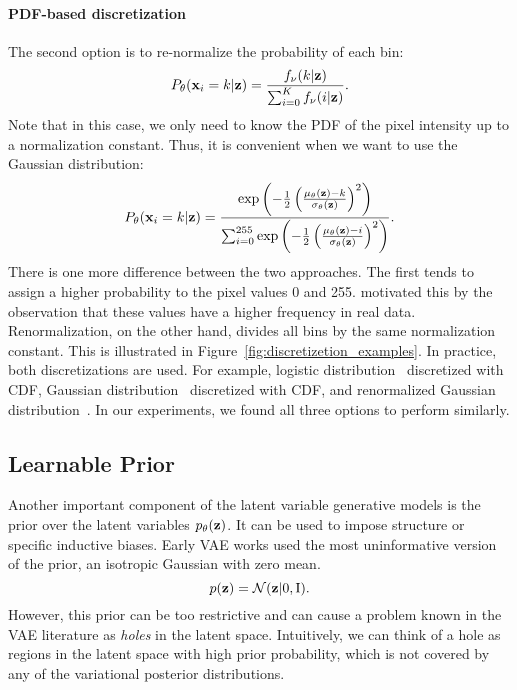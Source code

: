 \paragraph{PDF-based discretization}
The second option is to re-normalize the probability of each bin:
\begin{equation}\label{eq:intro_softmax_discr}
\begin{aligned}
    P_{\theta}(\rvx_i = k|\rvz) = \frac{f_{\nu}(k|\rvz)}{\sum_{i=0}^K f_{\nu}(i|\rvz)}.
\end{aligned}
\end{equation}
Note that in this case, we only need to know the PDF of the pixel intensity up to a normalization constant. 
Thus, it is convenient when we want to use the Gaussian distribution:
\begin{equation}
\begin{aligned}
    P_{\theta}({\mathbf{x}}_i = k|{\mathbf{z}}) = \frac{\exp\left(-\frac12 \left(\frac{\mu_{\theta}({\mathbf{z}}) - k}{\sigma_{\theta}({\mathbf{z}})}\right)^2\right)}{\sum_{i=0}^{255} \exp\left(-\frac12 \left(\frac{\mu_{\theta}({\mathbf{z}}) - i}{\sigma_{\theta}({\mathbf{z}})}\right)^2\right)}.
\end{aligned}
\end{equation}
There is one more difference between the two approaches. The first tends to assign a higher probability to the pixel values 0 and 255. \citet{salimans2016improved} motivated this by the observation that these values have a higher frequency in real data. Renormalization, on the other hand, divides all bins by the same normalization constant. This is illustrated in Figure~\ref{fig:discretizetion_examples}.
In practice, both discretizations are used. 
For example, logistic distribution~\citep{vahdat2020nvae, Child2020-ze} discretized with CDF, Gaussian distribution~\citep{ho2020denoising} discretized with CDF, and renormalized Gaussian distribution~\citep{kingma2021variational}. 
In our experiments, we found all three options to perform similarly. 

\subsection{Learnable Prior}
Another important component of the latent variable generative models is the prior over the latent variables $p_{\theta}({\mathbf{z}})$.
It can be used to impose structure or specific inductive biases. 
Early VAE works used the most uninformative version of the prior, an isotropic Gaussian with zero mean.
\begin{equation}
    p({\mathbf{z}}) = \mathcal{N}({\mathbf{z}} | 0, \text{I}).
\end{equation}
\newline
However, this prior can be too restrictive and can cause a problem known in the VAE literature as \textit{holes} in the latent space. Intuitively, we can think of a hole as regions in the latent space with high prior probability, which is not covered by any of the variational posterior distributions. 

